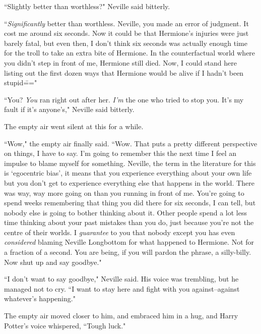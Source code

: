 ``Slightly better than worthless?" Neville said bitterly.

``\emph{Significantly} better than worthless. Neville, you made an error of judgment. It cost me around six seconds. Now it could be that Hermione's injuries were just barely fatal, but even then, I don't think six seconds was actually enough time for the troll to take an extra bite of Hermione. In the counterfactual world where you didn't step in front of me, Hermione still died. Now, I could stand here listing out the first dozen ways that Hermione would be alive if I hadn't been stupid\==="

``You? \emph{You} ran right out after her. \emph{I'm} the one who tried to stop you. It's my fault if it's anyone's," Neville said bitterly.

The empty air went silent at this for a while.

``Wow," the empty air finally said. ``Wow. That puts a pretty different perspective on things, I have to say. I'm going to remember this the next time I feel an impulse to blame myself for something. Neville, the term in the literature for this is `egocentric bias', it means that you experience everything about your own life but you don't get to experience everything else that happens in the world. There was way, way more going on than you running in front of me. You're going to spend weeks remembering that thing you did there for six seconds, I can tell, but nobody else is going to bother thinking about it. Other people spend a lot less time thinking about your past mistakes than you do, just because you're not the centre of their worlds. I \emph{guarantee} to you that nobody except you has even \emph{considered} blaming Neville Longbottom for what happened to Hermione. Not for a fraction of a second. You are being, if you will pardon the phrase, a silly-billy. Now shut up and say goodbye."

``I don't want to say goodbye," Neville said. His voice was trembling, but he managed not to cry. ``I want to stay here and fight with you against\---against whatever's happening."

The empty air moved closer to him, and embraced him in a hug, and Harry Potter's voice whispered, ``Tough luck."

